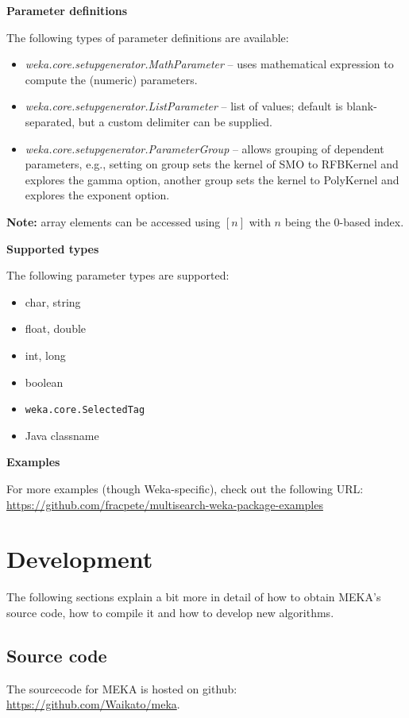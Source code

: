\documentclass[11pt]{article}
\newcommand{\heading}[1]{
    \vspace{0.3cm} \noindent \textbf{#1} \newline
}
\begin{document}
\heading{Parameter definitions}
The following types of parameter definitions are available:
\begin{itemize}
  \item \textit{weka.core.setupgenerator.MathParameter} -- uses mathematical
  expression to compute the (numeric) parameters.
  \item \textit{weka.core.setupgenerator.ListParameter} -- list of values; default
  is blank-separated, but a custom delimiter can be supplied.
  \item \textit{weka.core.setupgenerator.ParameterGroup} -- allows grouping of
  dependent parameters, e.g., setting on group sets the kernel of SMO to RFBKernel
  and explores the gamma option, another group sets the kernel to PolyKernel and
  explores the exponent option.
\end{itemize}

\textbf{Note:} array elements can be accessed using $[n]$ with $n$ being the
0-based index.

\heading{Supported types}
The following parameter types are supported:
\begin{itemize}
  \item char, string
  \item float, double
  \item int, long
  \item boolean
  \item \texttt{weka.core.SelectedTag}
  \item Java classname
\end{itemize}

\heading{Examples}
For more examples (though Weka-specific), check out the following URL: \\
\url{https://github.com/fracpete/multisearch-weka-package-examples}{}


\section{Development}
\label{development}
The following sections explain a bit more in detail of how to obtain MEKA's source code, how to compile it and how to develop new algorithms.

\subsection{Source code}
\label{sourcecode}
The sourcecode for MEKA is hosted on github: \url{https://github.com/Waikato/meka}.
\end{document}
